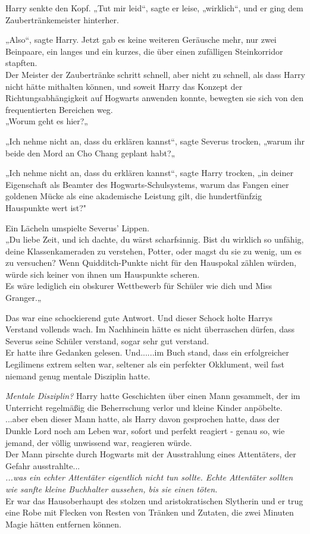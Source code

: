 {Harry senkte den Kopf. „Tut mir leid“, sagte er leise, „wirklich“, und er ging dem Zaubertränkemeister hinterher.

„Also“, sagte Harry. Jetzt gab es keine weiteren Geräusche mehr, nur zwei Beinpaare, ein langes und ein kurzes, die über einen zufälligen Steinkorridor stapften.\\ Der Meister der Zaubertränke schritt schnell, aber nicht zu schnell, als dass Harry nicht hätte mithalten können, und soweit Harry das Konzept der Richtungsabhängigkeit auf Hogwarts anwenden konnte, bewegten sie sich von den frequentierten Bereichen weg.\\ „Worum geht es hier?„

„Ich nehme nicht an, dass du erklären kannst“, sagte Severus trocken, „warum ihr beide den Mord an Cho Chang geplant habt?„

„Ich nehme nicht an, dass du erklären kannst“, sagte Harry trocken, „in deiner Eigenschaft als Beamter des Hogwarts-Schulsystems, warum das Fangen einer goldenen Mücke als eine akademische Leistung gilt, die hundertfünfzig Hauspunkte wert ist?"

Ein Lächeln umspielte Severus' Lippen.\\ „Du liebe Zeit, und ich dachte, du wärst scharfsinnig. Bist du wirklich so unfähig, deine Klassenkameraden zu verstehen, Potter, oder magst du sie zu wenig, um es zu versuchen? Wenn Quidditch-Punkte nicht für den Hauspokal zählen würden, würde sich keiner von ihnen um Hauspunkte scheren.\\ Es wäre lediglich ein obskurer Wettbewerb für Schüler wie dich und Miss Granger.„

Das war eine schockierend gute Antwort. Und dieser Schock holte Harrys Verstand vollends wach. Im Nachhinein hätte es nicht überraschen dürfen, dass Severus seine Schüler verstand, sogar sehr gut verstand.\\ Er hatte ihre Gedanken gelesen. Und......im Buch stand, dass ein erfolgreicher Legilimens extrem selten war, seltener als ein perfekter Okklument, weil fast niemand genug mentale Disziplin hatte.

\emph{Mentale Disziplin?} Harry hatte Geschichten über einen Mann gesammelt, der im Unterricht regelmäßig die Beherrschung verlor und kleine Kinder anpöbelte.\\ ...aber eben dieser Mann hatte, als Harry davon gesprochen hatte, dass der Dunkle Lord noch am Leben war, sofort und perfekt reagiert - genau so, wie jemand, der völlig unwissend war, reagieren würde.\\ Der Mann pirschte durch Hogwarts mit der Ausstrahlung eines Attentäters, der Gefahr ausstrahlte...\\ \emph{...was ein echter Attentäter eigentlich nicht tun sollte. Echte Attentäter sollten wie sanfte kleine Buchhalter aussehen, bis sie einen töten.}\\ Er war das Hausoberhaupt des stolzen und aristokratischen Slytherin und er trug eine Robe mit Flecken von Resten von Tränken und Zutaten, die zwei Minuten Magie hätten entfernen können.

}
